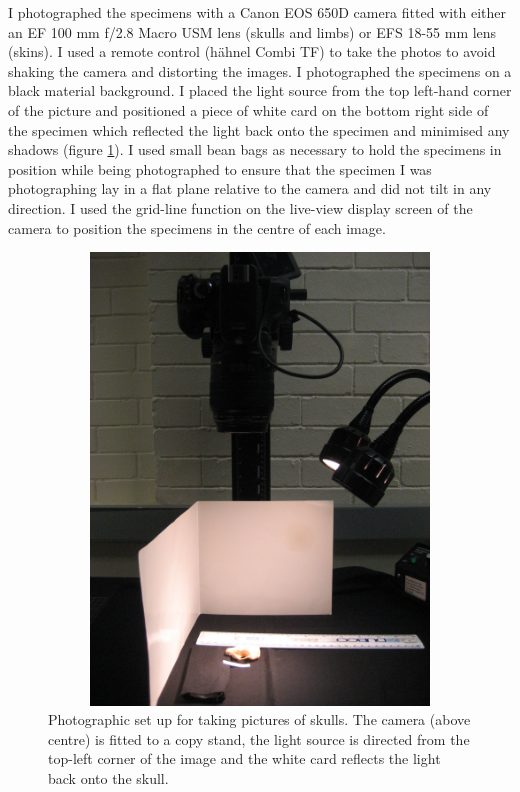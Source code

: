 	I photographed the specimens with a Canon EOS 650D camera fitted with either an EF 100 mm f/2.8 Macro USM lens (skulls and limbs) or EFS 18-55 mm lens (skins). I used a remote control (h\"ahnel Combi TF) to take the photos to avoid shaking the camera and distorting the images. I photographed the specimens on a black material background. I placed the light source from the top left-hand corner of the picture and positioned a piece of white card on the bottom right side of the specimen which reflected the light back onto the specimen and minimised any shadows (figure \ref{fig:camera}). I used small bean bags as necessary to hold the specimens in position while being photographed to ensure that the specimen I was photographing lay in a flat plane relative to the camera and did not tilt in any direction. I used the grid-line function on the live-view display screen of the camera to position the specimens in the centre of each image. 

\begin{figure}[h] 
  \centering
  \includegraphics[width=12cm, height=12cm, keepaspectratio=true]{Methods/figures/camera.jpg}
    \caption[Photographic set up]
    {Photographic set up for taking pictures of skulls. The camera (above centre) is fitted to a copy stand, the light source is directed from the top-left corner of the image and the white card reflects the light back onto the skull. }%
  \label{fig:camera}
  \end{figure}

